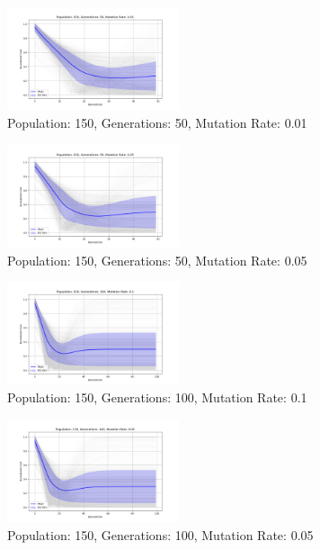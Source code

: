 \documentclass[
]{article}
\begin{document}
    \begin{figure}[H]
        \centering
        \includegraphics[width=0.45\textwidth]{genetic_algorithm/appendix/Population_150_Generations_50_MutationRate_0.01}
        \caption{Population: 150, Generations: 50, Mutation Rate: 0.01}
        \label{fig:app_ga_150_50_01}
    \end{figure}

    \begin{figure}[H]
        \centering
        \includegraphics[width=0.45\textwidth]{genetic_algorithm/appendix/Population_150_Generations_50_MutationRate_0.05}
        \caption{Population: 150, Generations: 50, Mutation Rate: 0.05}
        \label{fig:app_ga_150_50_05}
    \end{figure}

    \begin{figure}[H]
        \centering
        \includegraphics[width=0.45\textwidth]{genetic_algorithm/appendix/Population_150_Generations_100_MutationRate_0.1}
        \caption{Population: 150, Generations: 100, Mutation Rate: 0.1}
        \label{fig:app_ga_150_100_1}
    \end{figure}

    \begin{figure}[H]
        \centering
        \includegraphics[width=0.45\textwidth]{genetic_algorithm/appendix/Population_150_Generations_100_MutationRate_0.05}
        \caption{Population: 150, Generations: 100, Mutation Rate: 0.05}
        \label{fig:app_ga_150_100_05}
    \end{figure}
\end{document}
